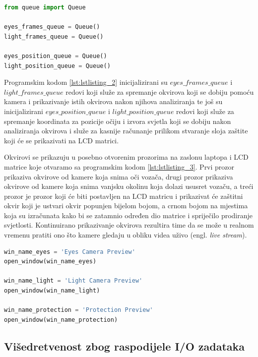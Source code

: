 \documentclass{foi}
\begin{document}
\begin{lstlisting}[language=Python, label={lst:lstlisting_2}, firstnumber=4, style=colored, caption=Uključivanje biblioteke $queue$ i inicijaliziranje redova]
from queue import Queue

eyes_frames_queue = Queue()
light_frames_queue = Queue()

eyes_position_queue = Queue()
light_position_queue = Queue()
\end{lstlisting}

Programskim kodom \ref{lst:lstlisting_2} inicijalizirani su  $eyes\_frames\_queue$ i $light\_frames\_queue$ redovi koji služe za spremanje okvirova koji se dobiju pomoću kamera i prikazivanje istih okvirova nakon njihova analiziranja te još su inicijalizirani $eyes\_position\_queue$ i $light\_position\_queue$ redovi koji služe za spremanje koordinata za pozicije očiju i izvora svjetla koji se dobiju nakon analiziranja okvirova i služe za kasnije računanje prilikom stvaranje sloja zaštite koji će se prikazivati na LCD matrici.

Okvirovi se prikazuju u posebno otvorenim prozorima na zaslonu laptopa i LCD matrice koje otvaramo sa programskim kodom \ref{lst:lstlisting_3}. Prvi prozor prikaziva okvirove od kamere koja snima oči vozača, drugi prozor prikaziva okvirove od kamere koja snima vanjsku okolinu koja dolazi ususret vozaču, a treći prozor je prozor koji će biti postavljen na LCD matricu i prikazivat će zaštitni okvir koji je ustvari okvir popunjen bijelom bojom, a crnom bojom na mjestima koja su izračunata kako bi se zatamnio određen dio matrice i spriječilo prodiranje svjetlosti. Kontinuirano prikazivanje okvirova rezultira time da se može u realnom vremenu pratiti ono što kamere gledaju u obliku videa uživo (engl. \emph{live stream}).

\begin{lstlisting}[language=Python, label={lst:lstlisting_3}, firstnumber=151, style=colored, caption=Otvaranje prozora na zaslonu]
win_name_eyes = 'Eyes Camera Preview'
open_window(win_name_eyes)

win_name_light = 'Light Camera Preview'
open_window(win_name_light)

win_name_protection = 'Protection Preview'
open_window(win_name_protection)
\end{lstlisting}

\subsection{Višedretvenost zbog raspodijele I/O zadataka}
\end{document}
